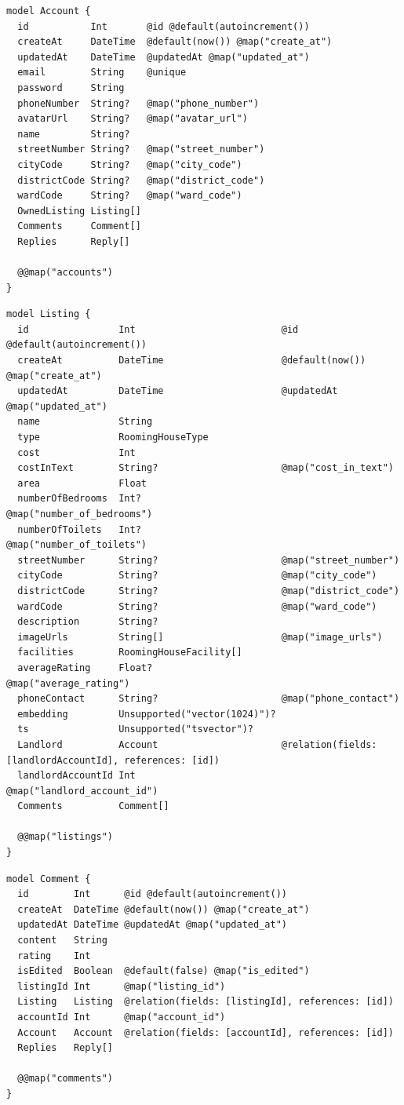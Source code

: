{\scriptsize
\begin{lstlisting}[caption={Ánh xạ bảng Account},captionpos=b]
model Account {
  id           Int       @id @default(autoincrement())
  createAt     DateTime  @default(now()) @map("create_at")
  updatedAt    DateTime  @updatedAt @map("updated_at")
  email        String    @unique
  password     String
  phoneNumber  String?   @map("phone_number")
  avatarUrl    String?   @map("avatar_url")
  name         String?
  streetNumber String?   @map("street_number")
  cityCode     String?   @map("city_code")
  districtCode String?   @map("district_code")
  wardCode     String?   @map("ward_code")
  OwnedListing Listing[]
  Comments     Comment[]
  Replies      Reply[]

  @@map("accounts")
}
\end{lstlisting}}
{\scriptsize
\begin{lstlisting}[caption={Ánh xạ bảng Listing},captionpos=b]
model Listing {
  id                Int                          @id @default(autoincrement())
  createAt          DateTime                     @default(now()) @map("create_at")
  updatedAt         DateTime                     @updatedAt @map("updated_at")
  name              String
  type              RoomingHouseType
  cost              Int
  costInText        String?                      @map("cost_in_text")
  area              Float
  numberOfBedrooms  Int?                         @map("number_of_bedrooms")
  numberOfToilets   Int?                         @map("number_of_toilets")
  streetNumber      String?                      @map("street_number")
  cityCode          String?                      @map("city_code")
  districtCode      String?                      @map("district_code")
  wardCode          String?                      @map("ward_code")
  description       String?
  imageUrls         String[]                     @map("image_urls")
  facilities        RoomingHouseFacility[]
  averageRating     Float?                       @map("average_rating")
  phoneContact      String?                      @map("phone_contact")
  embedding         Unsupported("vector(1024)")?
  ts                Unsupported("tsvector")?
  Landlord          Account                      @relation(fields: [landlordAccountId], references: [id])
  landlordAccountId Int                          @map("landlord_account_id")
  Comments          Comment[]

  @@map("listings")
}
\end{lstlisting}}
{\scriptsize
\begin{lstlisting}[caption={Ánh xạ bảng Comment},captionpos=b]
model Comment {
  id        Int      @id @default(autoincrement())
  createAt  DateTime @default(now()) @map("create_at")
  updatedAt DateTime @updatedAt @map("updated_at")
  content   String
  rating    Int
  isEdited  Boolean  @default(false) @map("is_edited")
  listingId Int      @map("listing_id")
  Listing   Listing  @relation(fields: [listingId], references: [id])
  accountId Int      @map("account_id")
  Account   Account  @relation(fields: [accountId], references: [id])
  Replies   Reply[]

  @@map("comments")
}
\end{lstlisting}}
